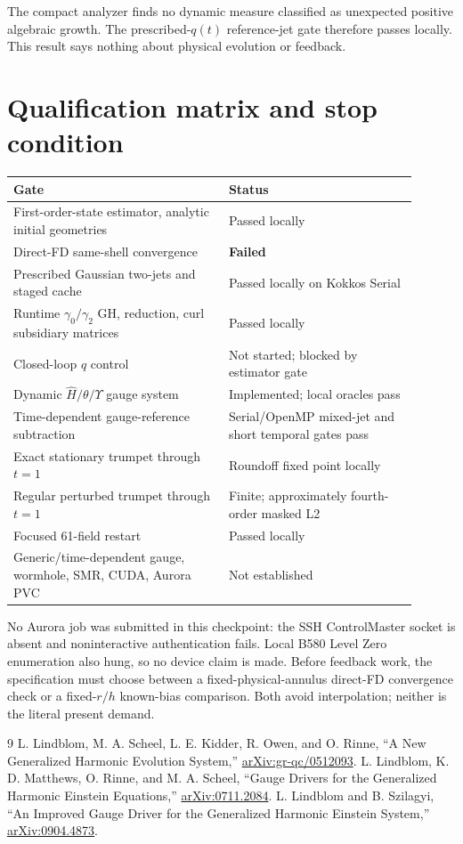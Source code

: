 \documentclass[11pt]{article}
\newcommand{\status}[1]{\textcolor{red!70!black}{\textbf{#1}}}
\begin{document}
The compact analyzer finds no dynamic measure classified as unexpected
positive algebraic growth.  The prescribed-$q(t)$ reference-jet gate therefore
passes locally.  This result says nothing about physical evolution or feedback.

\section{Qualification matrix and stop condition}

\begingroup
\small
\renewcommand{\arraystretch}{1.18}
\begin{tabular}{p{0.48\linewidth}p{0.42\linewidth}}
\toprule
Gate & Status\\
\midrule
First-order-state estimator, analytic initial geometries & Passed locally\\
Direct-FD same-shell convergence & \status{Failed}\\
Prescribed Gaussian two-jets and staged cache & Passed locally on Kokkos Serial\\
Runtime $\gamma_0/\gamma_2$ GH, reduction, curl subsidiary matrices & Passed locally\\
Closed-loop $q$ control & Not started; blocked by estimator gate\\
Dynamic $\widehat H/\theta/\Upsilon$ gauge system & Implemented; local oracles pass\\
Time-dependent gauge-reference subtraction & Serial/OpenMP mixed-jet and short temporal gates pass\\
Exact stationary trumpet through $t=1$ & Roundoff fixed point locally\\
Regular perturbed trumpet through $t=1$ & Finite; approximately fourth-order masked L2\\
Focused 61-field restart & Passed locally\\
Generic/time-dependent gauge, wormhole, SMR, CUDA, Aurora PVC & Not established\\
\bottomrule
\end{tabular}
\endgroup

No Aurora job was submitted in this checkpoint: the SSH ControlMaster socket
is absent and noninteractive authentication fails. Local B580 Level Zero
enumeration also hung, so no device claim is made. Before feedback work, the
specification must choose between a
fixed-physical-annulus direct-FD convergence check or a fixed-$r/h$ known-bias
comparison.  Both avoid interpolation; neither is the literal present demand.

\begin{thebibliography}{9}
L. Lindblom, M. A. Scheel, L. E. Kidder, R. Owen, and O. Rinne,
``A New Generalized Harmonic Evolution System,''
\href{https://arxiv.org/abs/gr-qc/0512093}{arXiv:gr-qc/0512093}.
L. Lindblom, K. D. Matthews, O. Rinne, and M. A. Scheel,
``Gauge Drivers for the Generalized Harmonic Einstein Equations,''
\href{https://arxiv.org/abs/0711.2084}{arXiv:0711.2084}.
L. Lindblom and B. Szilagyi,
``An Improved Gauge Driver for the Generalized Harmonic Einstein System,''
\href{https://arxiv.org/abs/0904.4873}{arXiv:0904.4873}.
\end{thebibliography}
\end{document}
